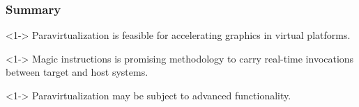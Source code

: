 
\begin{frame}
\frametitle{Summary}

\begin{thm}<1->
	Paravirtualization is feasible for accelerating graphics in virtual platforms.
\end{thm}

\begin{thm}<1->
	Magic instructions is promising methodology to carry real-time invocations between target and host systems.
\end{thm}

\begin{thm}<1->
	Paravirtualization may be subject to advanced functionality.
\end{thm}

\end{frame}

